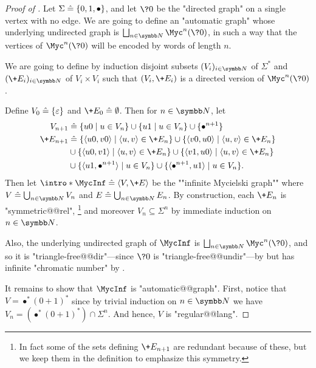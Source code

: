 \begin{proof}[Proof of ]
  Let $\Sigma \mathrel{\hat{=}} \{0,1,\bullet\}$, and let $\?0$ be the "directed
  graph" on a single vertex with no edge.
  We are going to define an "automatic graph" whose underlying undirected graph
  is $\bigdcup_{n\in\N} \Myc^n(\?0)$, in such a way that the vertices of $\Myc^n(\?0)$
  will be encoded by words of length $n$.

  We are going to define by induction
  disjoint subsets $(V_i)_{i\in\N}$ of $\Sigma^*$
  and $(\+E_i)_{i\in\N}$ of $V_i \times V_i$ such that
  $(V_i, \+E_i)$ is a directed version of $\Myc^n(\?0)$.

  Define $V_0 \mathrel{\hat{=}} \{\varepsilon\}$ and $\+E_0 \defeq \emptyset$.
  Then for $n \in \N$, let
  \begin{align*}
    V_{n+1} & \defeq \{u0\mid u \in V_n\}\cup \{u1\mid u \in V_n\}\cup\{\bullet^{n+1}\}\\
    \+E_{n+1} & \defeq \{\langle u0,v0\rangle \mid \langle u,v\rangle \in \+E_n\}
		\cup \{\langle v0,u0\rangle \mid \langle u,v\rangle \in \+E_n\} \\
		& \cup \{\langle u0,v1\rangle \mid \langle u,v\rangle \in \+E_n\}
		\cup \{\langle v1,u0\rangle \mid \langle u,v\rangle \in \+E_n\} \\
    	& \cup \{\langle u1, \bullet^{n+1}\rangle \mid u\in V_n\}
		\cup \{\langle \bullet^{n+1}, u1\rangle \mid u\in V_n\}.
  \end{align*}
  Then let \AP$\intro*\MycInf \defeq \tup{V, \+E}$ be
  the ""infinite Mycielski graph"" where $V \defeq \bigcup_{n\in \N} V_n$
  and $E \defeq \bigcup_{n\in \N} E_n$.
  By construction, each $\+E_n$ is "symmetric@@rel",%
  \footnote{In fact some of the sets defining $\+E_{n+1}$ are redundant because of these,
  but we keep them in the definition to emphasize this symmetry.}
  and moreover $V_n \subseteq \Sigma^n$ by immediate induction on $n\in\N$.

  Also, the underlying undirected graph of $\MycInf$ is
  $\bigdcup_{n\in\N} \Myc^n(\?0)$, and so it is "triangle-free@@dir"---since $\?0$ is "triangle-free@@undir"---by  but has infinite
  "chromatic number" by . 
  
  It remains to show that $\MycInf$ is "automatic@@graph".
  First, notice that $V = \bullet^*(0+1)^*$ since by trivial induction
  on $n\in\N$ we have $V_n = (\bullet^*(0+1)^*)\cap \Sigma^n$. And hence,
  $V$ is "regular@@lang".


\end{proof}
